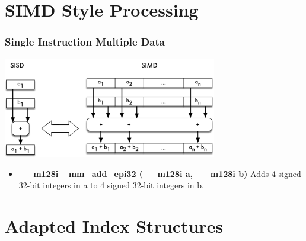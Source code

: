 \documentclass{beamer}
\begin{document}
\section{SIMD Style Processing}
\begin{frame}
\frametitle{Single Instruction Multiple Data}
\begin{center}
	\includegraphics[width=0.7\textwidth]{img/simd.pdf}
\end{center}
\begin{itemize}
	\item \textbf{\_\_m128i \_mm\_add\_epi32 (\_\_m128i a, \_\_m128i b)} Adds  4 signed 32-bit integers in a to 4 signed 32-bit integers
	in b.
\end{itemize}
\end{frame}
\section{Adapted Index Structures}
\end{document}
